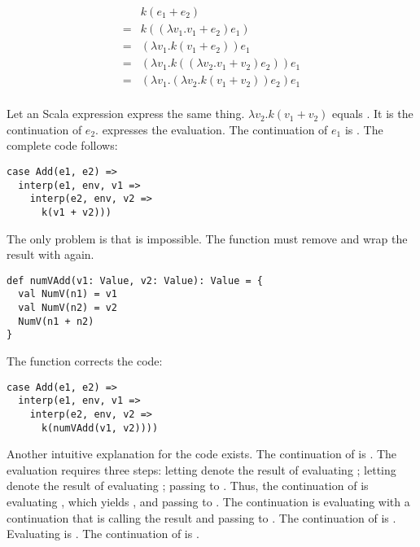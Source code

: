 \[
\begin{array}{rl}
& k(e_1+e_2) \\
= & k((\lambda v_1.v_1+e_2)e_1) \\
= & (\lambda v_1.k(v_1+e_2))e_1 \\
= & (\lambda v_1.k((\lambda v_2.v_1+v_2)e_2))e_1 \\
= & (\lambda v_1.(\lambda v_2.k(v_1+v_2))e_2)e_1 \\
\end{array}
\]

Let an Scala expression express the same thing. $\lambda v_2.k(v_1+v_2)$ equals
. It is the continuation of $e_2$.  expresses the evaluation. The continuation of $e_1$ is
. The complete code follows:

\begin{verbatim}
case Add(e1, e2) =>
  interp(e1, env, v1 =>
    interp(e2, env, v2 =>
      k(v1 + v2)))
\end{verbatim}

The only problem is that  is impossible. The function must remove
 and wrap the result with  again.

\begin{verbatim}
def numVAdd(v1: Value, v2: Value): Value = {
  val NumV(n1) = v1
  val NumV(n2) = v2
  NumV(n1 + n2)
}
\end{verbatim}

The  function corrects the code:

\begin{verbatim}
case Add(e1, e2) =>
  interp(e1, env, v1 =>
    interp(e2, env, v2 =>
      k(numVAdd(v1, v2))))
\end{verbatim}

Another intuitive explanation for the code exists. The continuation of
 is . The evaluation requires three steps: letting
 denote the result of evaluating ; letting  denote the
result of evaluating ; passing  to . Thus,
the continuation of  is evaluating , which yields ,
and passing  to . The continuation is evaluating
 with a continuation that is calling the result  and passing
 to . The continuation of  is . Evaluating  is . The continuation of  is .

